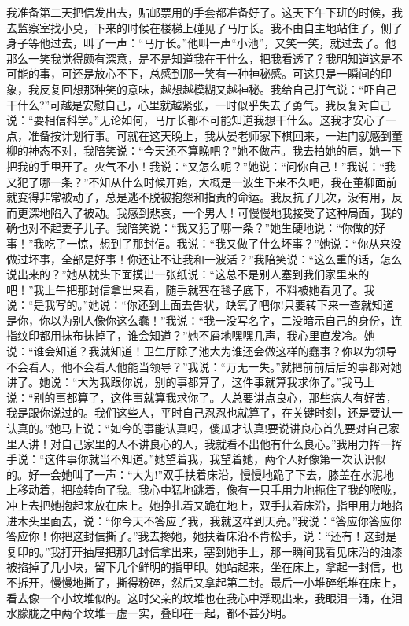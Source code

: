 \documentclass[12pt,oneside]{book}
\begin{document}
我准备第二天把信发出去，贴邮票用的手套都准备好了。这天下午下班的时候，我去监察室找小莫，下来的时候在楼梯上碰见了马厅长。我不由自主地站住了，侧了身子等他过去，叫了一声：``马厅长。''他叫一声``小池''，又笑一笑，就过去了。他那么一笑我觉得颇有深意，是不是知道我在干什么，把我看透了？我明知道这是不可能的事，可还是放心不下，总感到那一笑有一种神秘感。可这只是一瞬间的印象，我反复回想那种笑的意味，越想越模糊又越神秘。我给自己打气说：``吓自己干什么?''可越是安慰自己，心里就越紧张，一时似乎失去了勇气。我反复对自己说：``要相信科学。''无论如何，马厅长都不可能知道我想干什么。这我才安心了一点，准备按计划行事。可就在这天晚上，我从晏老师家下棋回来，一进门就感到董柳的神态不对，我陪笑说：``今天还不算晚吧？''她不做声。我去拍她的肩，她一下把我的手甩开了。火气不小！我说：``又怎么呢？''她说：``问你自己！''我说：``我又犯了哪一条？''不知从什么时候开始，大概是一波生下来不久吧，我在董柳面前就变得非常被动了，总是逃不脱被抱怨和指责的命运。我反抗了几次，没有用，反而更深地陷入了被动。我感到悲哀，一个男人！可慢慢地我接受了这种局面，我的确也对不起妻子儿子。我陪笑说：``我又犯了哪一条？''她生硬地说：``你做的好事！''我吃了一惊，想到了那封信。我说：``我又做了什么坏事？''她说：``你从来没做过坏事，全部是好事！你还让不让我和一波活？''我陪笑说：``这么重的话，怎么说出来的？''她从枕头下面摸出一张纸说：``这总不是别人塞到我们家里来的吧！''我上午把那封信拿出来看，随手就塞在毯子底下，不料被她看见了。我说：``是我写的。''她说：``你还到上面去告状，缺氧了吧你!只要转下来一查就知道是你，你以为别人像你这么蠢！''我说：``我一没写名字，二没暗示自己的身份，连指纹印都用抹布抹掉了，谁会知道？''她不屑地嘿嘿几声，我心里直发冷。她说：``谁会知道？我就知道！卫生厅除了池大为谁还会做这样的蠢事？你以为领导不会看人，他不会看人他能当领导？''我说：``万无一失。''就把前前后后的事都对她讲了。她说：``大为我跟你说，别的事都算了，这件事就算我求你了。''我马上说：``别的事都算了，这件事就算我求你了。人总要讲点良心，那些病人有好苦，我是跟你说过的。我们这些人，平时自己忍忍也就算了，在关键时刻，还是要认一认真的。''她马上说：``如今的事能认真吗，傻瓜才认真!要说讲良心首先要对自己家里人讲！对自己家里的人不讲良心的人，我就看不出他有什么良心。''我用力挥一挥手说：``这件事你就当不知道。''她望着我，我望着她，两个人好像第一次认识似的。好一会她叫了一声：``大为!''双手扶着床沿，慢慢地跪了下去，膝盖在水泥地上移动着，把脸转向了我。我心中猛地跳着，像有一只手用力地扼住了我的喉咙，冲上去把她抱起来放在床上。她挣扎着又跪在地上，双手扶着床沿，指甲用力地掐进木头里面去，说：``你今天不答应了我，我就这样到天亮。''我说：``答应你答应你答应你！你把这封信撕了。''我去搀她，她扶着床沿不肯松手，说：``还有！这封是复印的。''我打开抽屉把那几封信拿出来，塞到她手上，那一瞬间我看见床沿的油漆被掐掉了几小块，留下几个鲜明的指甲印。她站起来，坐在床上，拿起一封信，也不拆开，慢慢地撕了，撕得粉碎，然后又拿起第二封。最后一小堆碎纸堆在床上，看去像一个小坟堆似的。这时父亲的坟堆也在我心中浮现出来，我眼泪一涌，在泪水朦胧之中两个坟堆一虚一实，叠印在一起，都不甚分明。
\end{document}
